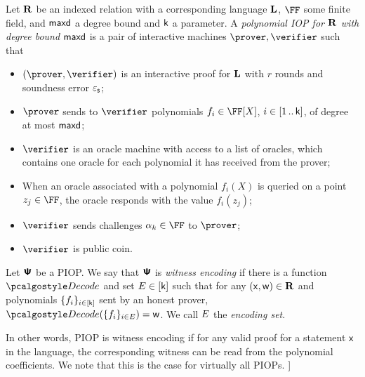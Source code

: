\documentclass[runningheads,11pt]{llncs}
\begin{document}
 \begin{definition}
  \label{def:piop}
  Let $\mathbf{R}$ be an indexed relation with a corresponding language $\mathbf{L}$, $\FF$
  some finite field, and $\mathsf{maxd}$ a degree bound and $\mathsf{k}$ a parameter. A
  \emph{polynomial IOP for $\mathbf{R}$ with degree bound $\mathsf{maxd}$} is a pair of
  interactive machines $\prover, \verifier$ such that
\begin{itemize}
\item $(\prover, \verifier)$ is an interactive proof for $\mathbf{L}$ with $r$ rounds
  and soundness error $\varepsilon_{\mathsf{s}}$;
\item $\prover$ sends to $\verifier$ polynomials $f_i \in \FF[X]$,
  $i \in [1 \, .. \, \mathsf{k}]$, of degree at most $\mathsf{maxd}$;
\item $\verifier$ is an oracle machine with access to a list of oracles, which
  contains one oracle for each polynomial it has received from the prover;
\item When an oracle associated with a polynomial $f_i(X)$ is queried on a point
  $z_j \in \FF$, the oracle responds with the value $f_i(z_j)$; 
\item $\verifier$ sends challenges $\alpha_k \in \FF$ to $\prover$;
\item $\verifier$ is public coin.
\end{itemize}
\end{definition}


\begin{definition}
  \label{def:wepiop}
  Let $\bm{\mathsf{\Psi}}$ be a PIOP.  We say that $\bm{\mathsf{\Psi}}$ is \emph{witness encoding} if there is
  a function $\decode$ and set $E \in [\mathsf{k}]$ such that for any
  $(\mathsf{x}, \mathsf{w}) \in \mathbf{R}$ and polynomials $\{f_i\}_{i \in [\mathsf{k}]}$ sent by an
  honest prover, $\decode(\smallset{f_i}_{i \in \encset}) = \wit$. We call $E$ the
  \emph{encoding set}.
\end{definition}
In other words, PIOP is witness encoding if for any valid proof for a statement
$\mathsf{x}$ in the language, the corresponding witness can be read from the
polynomial coefficients. We note that this is the case for virtually all
PIOPs. ]
\end{document}

